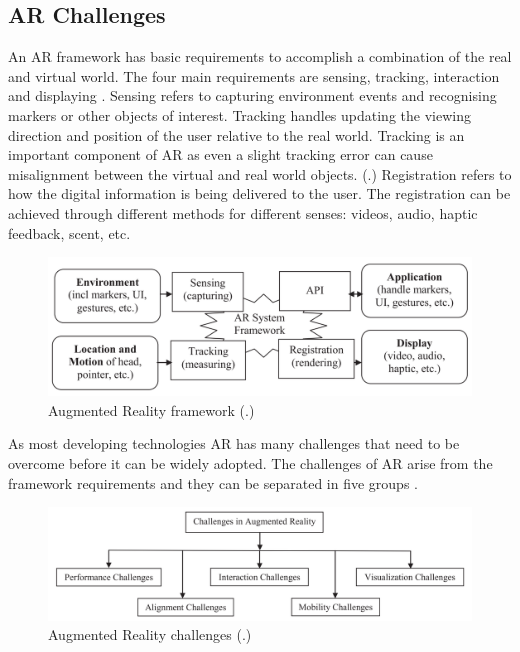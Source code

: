 \documentclass[12pt, a4paper,oneside, nocenter]{thesis}
\renewcommand{\citep}[1]{(\citealp{#1}.)}
\begin{document}
\subsection{AR Challenges}
An AR framework has basic requirements to accomplish a combination of the real and virtual world.
The four main requirements are sensing, tracking, interaction and displaying . Sensing refers to
capturing environment events and recognising markers or other objects of interest. Tracking handles updating the
viewing direction and position of the user relative to the real world. Tracking is an important component
of AR as even a slight tracking error can cause misalignment between the virtual and real world objects. \citep{ar-design} 
Registration refers to how the digital information is being delivered to the user. The registration can be achieved
through different methods for different senses: videos, audio, haptic feedback, scent, etc.
\begin{figure}[H]
\includegraphics[width=\textwidth]{ar-framework}
\caption{Augmented Reality framework \citep{vrjournal}}
\label{fig:ar-framework}
\end{figure}
As most developing technologies AR has many challenges that need to be overcome before it can be widely adopted.
The challenges of AR arise from the framework requirements and they can be separated in five groups .
\begin{figure}[H]
\includegraphics[width=\textwidth]{ar-challenges}
\caption{Augmented Reality challenges \citep{Acta-Graphica}}
\label{fig:ar-challenges}
\end{figure}
\end{document}
